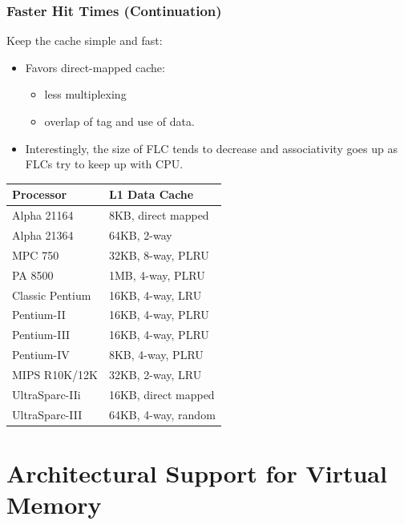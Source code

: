 \documentclass{beamer}
\begin{document}
\begin{frame}[fragile,t]
\frametitle{Faster Hit Times (Continuation)}

Keep the cache simple and fast:\smallskip
\begin{itemize}
    \item Favors direct-mapped cache:
        \begin{itemize}
            \item less multiplexing
            \item overlap of tag and use of data.
        \end{itemize}\smallskip
    \item Interestingly, the size of FLC tends to decrease and
            associativity goes up as FLCs try to keep up with CPU.
\end  {itemize}

\begin{scriptsize}
\begin{tabular}{ll}
\hline
Processor    &  L1 Data Cache\\\hline
Alpha 21164  &  8KB, direct mapped\\\hline
Alpha 21364  &  64KB, 2-way\\\hline
MPC 750  &  32KB, 8-way, PLRU\\\hline
PA 8500  &  1MB, 4-way, PLRU\\\hline
Classic Pentium  &  16KB, 4-way, LRU\\\hline
Pentium-II  &  16KB, 4-way, PLRU\\\hline
Pentium-III  &  16KB, 4-way, PLRU\\\hline
Pentium-IV  &  8KB, 4-way, PLRU\\\hline
MIPS R10K/12K  &  32KB, 2-way, LRU\\\hline
UltraSparc-IIi  &  16KB, direct mapped\\\hline
UltraSparc-III  &  64KB, 4-way, random\\\hline
\end{tabular}
\end{scriptsize}
\end{frame}

\section{Architectural Support for Virtual Memory}

\begin{frame}[fragile]
	\tableofcontents[currentsection]
\end{frame}
\end{document}
